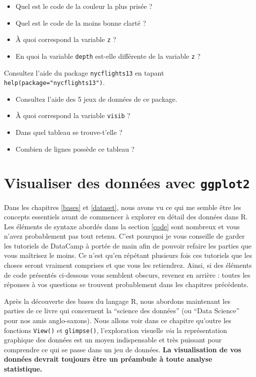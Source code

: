 \documentclass[
  a4paper,
]{article}
\providecommand{\tightlist}{%
  \setlength{\itemsep}{0pt}\setlength{\parskip}{0pt}}
\begin{document}
\begin{itemize}
\tightlist
\item
  Quel est le code de la couleur la plus prisée ?
\item
  Quel est le code de la moins bonne clarté ?
\item
  À quoi correspond la variable \texttt{z} ?
\item
  En quoi la variable \texttt{depth} est-elle différente de la variable \texttt{z} ?
\end{itemize}

Consultez l'aide du package \texttt{nycflights13} en tapant \texttt{help(package="nycflights13")}.

\begin{itemize}
\tightlist
\item
  Consultez l'aide des 5 jeux de données de ce package.
\item
  À quoi correspond la variable \texttt{visib} ?
\item
  Dans quel tableau se trouve-t'elle ?
\item
  Combien de lignes possède ce tableau ?
\end{itemize}

\hypertarget{viz}{%
\section{\texorpdfstring{Visualiser des données avec \texttt{ggplot2}}{Visualiser des données avec ggplot2}}\label{viz}}

Dans les chapitres \ref{bases} et \ref{dataset}, nous avons vu ce qui me semble être les concepts essentiels avant de commencer à explorer en détail des données dans R. Les éléments de syntaxe abordés dans la section \ref{code} sont nombreux et vous n'avez probablement pas tout retenu. C'est pourquoi je vous conseille de garder les tutoriels de DataCamp à portée de main afin de pouvoir refaire les parties que vous maîtrisez le moins. Ce n'est qu'en répétant plusieurs fois ces tutoriels que les choses seront vraiment comprises et que vous les retiendrez. Ainsi, si des éléments de code présentés ci-dessous vous semblent obscurs, revenez en arrière : toutes les réponses à vos questions se trouvent probablement dans les chapitres précédents.

Après la découverte des bases du langage R, nous abordons maintenant les parties de ce livre qui concernent la ``science des données'' (ou ``Data Science'' pour nos amis anglo-saxons). Nous allons voir dans ce chapitre qu'outre les fonctions \texttt{View()} et \texttt{glimpse()}, l'exploration visuelle \emph{via} la représentation graphique des données est un moyen indispensable et très puissant pour comprendre ce qui se passe dans un jeu de données. \textbf{La visualisation de vos données devrait toujours être un préambule à toute analyse statistique.}
\end{document}
